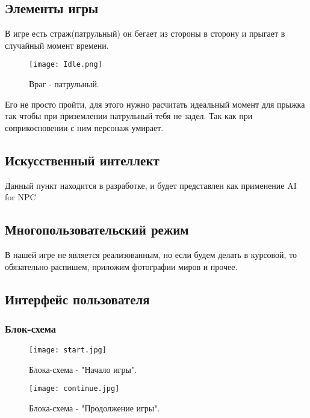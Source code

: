 \documentclass[a4paper,12pt]{article}
\begin{document}
\subsection{Элементы игры}
В игре есть страж(патрульный) он бегает из стороны в сторону и прыгает в случайный момент времени.
    \begin{figure}[H] 
    \centering
    \texttt{[image: Idle.png]} 
    \caption{Враг - патрульный.}
    \label{fig:player_character}
    \end{figure}
Его не просто пройти, для этого нужно расчитать идеальный момент для прыжка так чтобы при приземлении патрульный тебя не задел. Так как при соприкосновении с ним персонаж умирает.

\subsection{Искусственный интеллект}
Данный пункт находится в разработке, и будет представлен как применение AI for NPC

\subsection{Многопользовательский режим}
В нашей игре не является реализованным, но если будем делать в курсовой, то обязательно распишем, приложим фотографии миров и прочее.

\subsection{Интерфейс пользователя}


\subsubsection{Блок-схема}
    \begin{figure}[H] %
    \centering
    \texttt{[image: start.jpg]} %
    \caption{Блока-схема - "Начало игры".}
    \label{fig:player_character}
    \end{figure}

    \begin{figure}[H] %
    \centering
    \texttt{[image: continue.jpg]} %
    \caption{Блока-схема - "Продолжение игры".}
    \label{fig:player_character}
    \end{figure}
\end{document}
